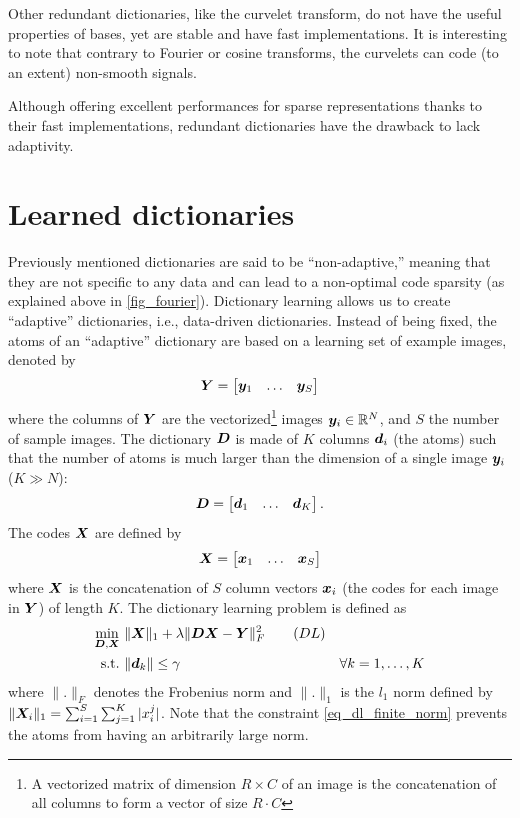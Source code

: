 \noindent
Other redundant dictionaries, like the curvelet transform, do not have the useful properties of bases, yet are stable and have fast implementations. It is interesting to note that contrary to Fourier or cosine transforms, the curvelets can code (to an extent) non-smooth signals.


\noindent
Although offering excellent performances for sparse representations thanks to their fast implementations, redundant dictionaries have the drawback to lack adaptivity.


\section{Learned dictionaries}
Previously mentioned dictionaries are said to be “non-adaptive,” meaning that they are not specific to any data and can lead to a non-optimal code sparsity (as explained above in \cref{fig_fourier}). Dictionary learning allows us to create “adaptive” dictionaries, i.e., data-driven dictionaries. Instead of being fixed, the atoms of an “adaptive” dictionary are based on a learning set of example images, denoted by
\begin{equation*}\bm{Y} = \begin{bmatrix} \bm{y}_1 & \dots & \bm{y}_S \end{bmatrix}\end{equation*}
where the columns of $\bm{Y}$ are the vectorized\footnote{A vectorized matrix of dimension $R \times C$ of an image is the concatenation of all columns to form a vector of size $R \cdot C$} images $\bm{y}_i \in \mathbb{R}^N$, and $S$ the number of sample images. The dictionary $\bm{D}$ is made of $K$ columns $\bm{d}_i$ (the atoms) such that the number of atoms is much larger than the dimension of a single image $\bm{y}_i$ ($K \gg N$):
\begin{equation*}\bm{D} = \begin{bmatrix} \bm{d}_1 & \dots & \bm{d}_K \end{bmatrix}.\end{equation*}
The codes $\bm{X}$ are defined by
\begin{equation*}\bm{X} = \begin{bmatrix} \bm{x}_1 & \dots & \bm{x}_{S} \end{bmatrix}\end{equation*}
where $\bm{X}$ is the concatenation of $S$ column vectors $\bm{x}_i$ (the codes for each image in $\bm{Y}$) of length $K$. The dictionary learning problem is defined as
\begin{align}
\underset{\bm{D},\bm{X}}{\min}~ & \lVert \bm{X} \rVert_1 + \lambda\lVert \bm{D}\bm{X}-\bm{Y} \rVert^2_F \tag{$DL$}\label{eq_dl} \\
\text{s.t.}~ & \lVert \bm{d}_k \rVert \le \gamma & \forall k = 1,\dots,K\label{eq_dl_finite_norm}
\end{align}
where $\lVert . \rVert_F$ denotes the Frobenius norm and $\lVert . \rVert_1$ is the $l_1$ norm defined by $\|\bm{X}_i\|_1  = \sum_{i=1}^S \sum_{j=1}^K |x_i^j|$.
Note that the constraint \ref{eq_dl_finite_norm} prevents the atoms from having an arbitrarily large norm.

